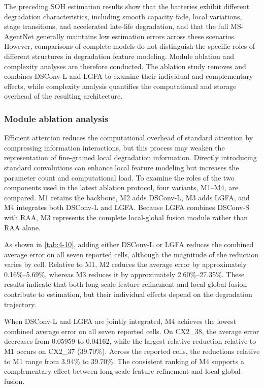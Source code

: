 The preceding SOH estimation results show that the batteries exhibit different degradation characteristics, including smooth capacity fade, local variations, stage transitions, and accelerated late-life degradation, and that the full MS-AgentNet generally maintains low estimation errors across these scenarios. However, comparisons of complete models do not distinguish the specific roles of different structures in degradation feature modeling. Module ablation and complexity analyses are therefore conducted. The ablation study removes and combines DSConv-L and LGFA to examine their individual and complementary effects, while complexity analysis quantifies the computational and storage overhead of the resulting architecture.

\subsubsection{Module ablation analysis}

Efficient attention reduces the computational overhead of standard attention by compressing information interactions\cite{ref39,ref40,ref43,ref44}, but this process may weaken the representation of fine-grained local degradation information\cite{ref31}. Directly introducing standard convolutions can enhance local feature modeling but increases the parameter count and computational load\cite{ref71}. To examine the roles of the two components used in the latest ablation protocol, four variants, M1–M4, are compared. M1 retains the backbone, M2 adds DSConv-L, M3 adds LGFA, and M4 integrates both DSConv-L and LGFA. Because LGFA combines DSConv-S with RAA, M3 represents the complete local-global fusion module rather than RAA alone.


As shown in \cref{tab:4-10}, adding either DSConv-L or LGFA reduces the combined average error on all seven reported cells, although the magnitude of the reduction varies by cell. Relative to M1, M2 reduces the average error by approximately 0.16\%--5.69\%, whereas M3 reduces it by approximately 2.60\%--27.35\%. These results indicate that both long-scale feature refinement and local-global fusion contribute to estimation, but their individual effects depend on the degradation trajectory.

When DSConv-L and LGFA are jointly integrated, M4 achieves the lowest combined average error on all seven reported cells. On CX2\_38, the average error decreases from 0.05959 to 0.04162, while the largest relative reduction relative to M1 occurs on CX2\_37 (39.70\%). Across the reported cells, the reductions relative to M1 range from 3.94\% to 39.70\%. The consistent ranking of M4 supports a complementary effect between long-scale feature refinement and local-global fusion.

